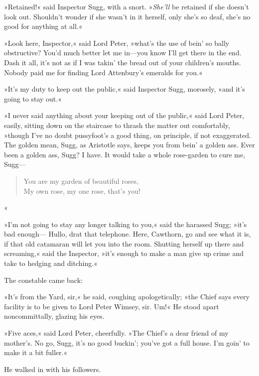 »Retained!« said Inspector Sugg, with a snort. »\textit{She'll} be retained if she doesn't look out. Shouldn't wonder if she wasn't in it herself, only she's so deaf, she's no good for anything at all.«

»Look here, Inspector,« said Lord Peter, »what's the use of bein' so bally obstructive? You'd much better let me in—you know I'll get there in the end. Dash it all, it's not as if I was takin' the bread out of your children's mouths. Nobody paid me for finding Lord Attenbury's emeralds for you.«

»It's my duty to keep out the public,« said Inspector Sugg, morosely, »and it's going to stay out.«

»I never said anything about your keeping out of the public,« said Lord Peter, easily, sitting down on the staircase to thrash the matter out comfortably, »though I've no doubt pussyfoot's a good thing, on principle, if not exaggerated. The golden mean, Sugg, as Aristotle says, keeps you from bein' a golden ass. Ever been a golden ass, Sugg? I have. It would take a whole rose-garden to cure me, Sugg---

\begin{verse}
You are my garden of beautiful roses,\\
My own rose, my one rose, that's you!\\
\end{verse}«

»I'm not going to stay any longer talking to you,« said the harassed Sugg; »it's bad enough--- Hullo, drat that telephone. Here, Cawthorn, go and see what it is, if that old catamaran will let you into the room. Shutting herself up there and screaming,« said the Inspector, »it's enough to make a man give up crime and take to hedging and ditching.«

The constable came back:

»It's from the Yard, sir,« he said, coughing apologetically; »the Chief says every facility is to be given to Lord Peter Wimsey, sir. Um!« He stood apart noncommittally, glazing his eyes.

»Five aces,« said Lord Peter, cheerfully. »The Chief's a dear friend of my mother's. No go, Sugg, it's no good buckin'; you've got a full house. I'm goin' to make it a bit fuller.«

He walked in with his followers.

